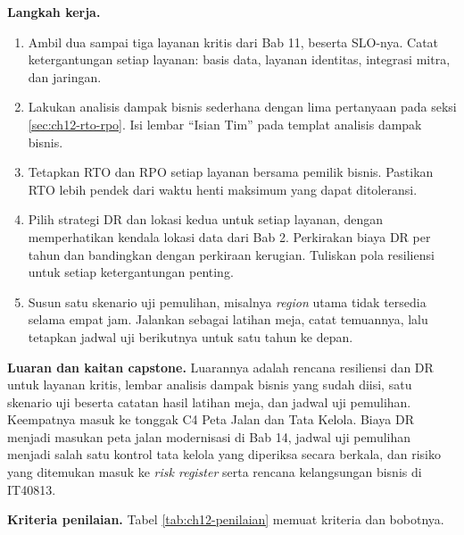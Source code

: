 \textbf{Langkah kerja.}
\begin{enumerate}
  \item Ambil dua sampai tiga layanan kritis dari Bab 11, beserta SLO-nya. Catat ketergantungan
        setiap layanan: basis data, layanan identitas, integrasi mitra, dan jaringan.
  \item Lakukan analisis dampak bisnis sederhana dengan lima pertanyaan pada seksi
        \ref{sec:ch12-rto-rpo}. Isi lembar ``Isian Tim'' pada templat analisis dampak bisnis.
  \item Tetapkan RTO dan RPO setiap layanan bersama pemilik bisnis. Pastikan RTO lebih pendek dari
        waktu henti maksimum yang dapat ditoleransi.
  \item Pilih strategi DR dan lokasi kedua untuk setiap layanan, dengan memperhatikan kendala
        lokasi data dari Bab 2. Perkirakan biaya DR per tahun dan bandingkan dengan perkiraan
        kerugian. Tuliskan pola resiliensi untuk setiap ketergantungan penting.
  \item Susun satu skenario uji pemulihan, misalnya \textit{region} utama tidak tersedia selama
        empat jam. Jalankan sebagai latihan meja, catat temuannya, lalu tetapkan jadwal uji
        berikutnya untuk satu tahun ke depan.
\end{enumerate}

\textbf{Luaran dan kaitan capstone.} Luarannya adalah rencana resiliensi dan DR untuk layanan
kritis, lembar analisis dampak bisnis yang sudah diisi, satu skenario uji beserta catatan hasil
latihan meja, dan jadwal uji pemulihan. Keempatnya masuk ke tonggak C4 Peta Jalan dan Tata Kelola.
Biaya DR menjadi masukan peta jalan modernisasi di Bab 14, jadwal uji pemulihan menjadi salah satu
kontrol tata kelola yang diperiksa secara berkala, dan risiko yang ditemukan masuk ke
\textit{risk register} serta rencana kelangsungan bisnis di IT40813.

\textbf{Kriteria penilaian.} Tabel \ref{tab:ch12-penilaian} memuat kriteria dan bobotnya.

